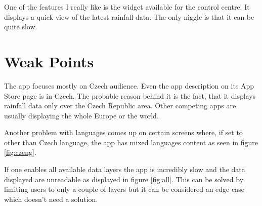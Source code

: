 \documentclass[11pt,a4paper]{article}
\begin{document}
One of the features I really like is the widget available for the control centre. It displays a quick view of the latest rainfall data. The only niggle is that it can be quite slow.

\section{Weak Points}

The app focuses mostly on Czech audience. Even the app description on its App Store page is in Czech. The probable reason behind it is the fact, that it displays rainfall data only over the Czech Republic area. Other competing apps are usually displaying the whole Europe or the world.

Another problem with languages comes up on certain screens where, if set to other than Czech language, the app has mixed languages content as seen in figure \ref{fig:czeng}.

If one enables all available data layers the app is incredibly slow and the data displayed are unreadable as displayed in figure \ref{fig:all}. This can be solved by limiting users to only a couple of layers but it can be considered an edge case which doesn't need a solution.
\end{document}
